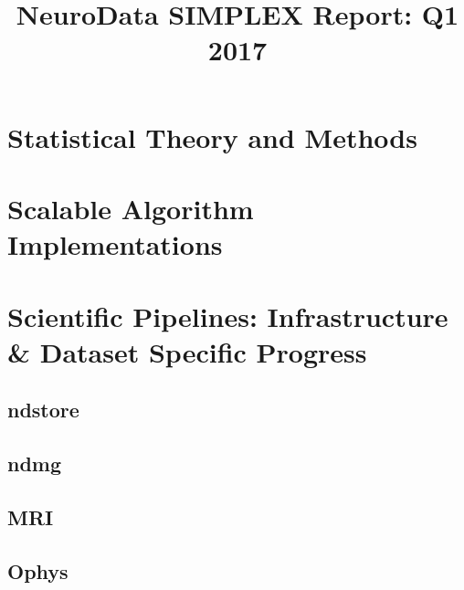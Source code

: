 \documentclass[12pt]{article}
\title{NeuroData SIMPLEX Report: Q1 2017}
\begin{document}

\newpage




\section{Statistical Theory and Methods}













\section{Scalable Algorithm Implementations}







\section{Scientific Pipelines: Infrastructure \& Dataset Specific
  Progress}


\subsection{ndstore}
\subsection{ndmg}

\subsection{MRI}

\subsection{Ophys}





%
\end{document}
